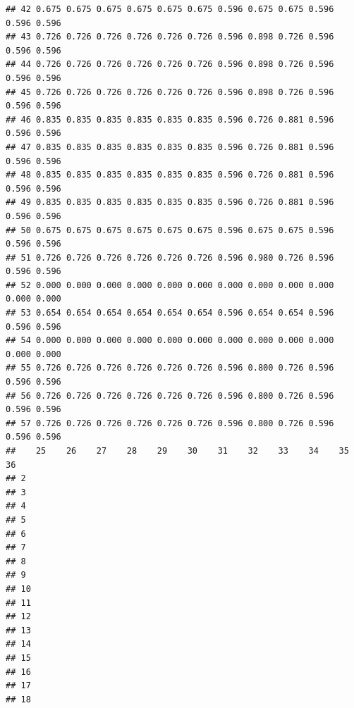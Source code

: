 \documentclass[
]{book}
\begin{document}
\begin{verbatim}
## 42 0.675 0.675 0.675 0.675 0.675 0.675 0.596 0.675 0.675 0.596 0.596 0.596
## 43 0.726 0.726 0.726 0.726 0.726 0.726 0.596 0.898 0.726 0.596 0.596 0.596
## 44 0.726 0.726 0.726 0.726 0.726 0.726 0.596 0.898 0.726 0.596 0.596 0.596
## 45 0.726 0.726 0.726 0.726 0.726 0.726 0.596 0.898 0.726 0.596 0.596 0.596
## 46 0.835 0.835 0.835 0.835 0.835 0.835 0.596 0.726 0.881 0.596 0.596 0.596
## 47 0.835 0.835 0.835 0.835 0.835 0.835 0.596 0.726 0.881 0.596 0.596 0.596
## 48 0.835 0.835 0.835 0.835 0.835 0.835 0.596 0.726 0.881 0.596 0.596 0.596
## 49 0.835 0.835 0.835 0.835 0.835 0.835 0.596 0.726 0.881 0.596 0.596 0.596
## 50 0.675 0.675 0.675 0.675 0.675 0.675 0.596 0.675 0.675 0.596 0.596 0.596
## 51 0.726 0.726 0.726 0.726 0.726 0.726 0.596 0.980 0.726 0.596 0.596 0.596
## 52 0.000 0.000 0.000 0.000 0.000 0.000 0.000 0.000 0.000 0.000 0.000 0.000
## 53 0.654 0.654 0.654 0.654 0.654 0.654 0.596 0.654 0.654 0.596 0.596 0.596
## 54 0.000 0.000 0.000 0.000 0.000 0.000 0.000 0.000 0.000 0.000 0.000 0.000
## 55 0.726 0.726 0.726 0.726 0.726 0.726 0.596 0.800 0.726 0.596 0.596 0.596
## 56 0.726 0.726 0.726 0.726 0.726 0.726 0.596 0.800 0.726 0.596 0.596 0.596
## 57 0.726 0.726 0.726 0.726 0.726 0.726 0.596 0.800 0.726 0.596 0.596 0.596
##    25    26    27    28    29    30    31    32    33    34    35    36   
## 2                                                                         
## 3                                                                         
## 4                                                                         
## 5                                                                         
## 6                                                                         
## 7                                                                         
## 8                                                                         
## 9                                                                         
## 10                                                                        
## 11                                                                        
## 12                                                                        
## 13                                                                        
## 14                                                                        
## 15                                                                        
## 16                                                                        
## 17                                                                        
## 18                                                                        

\end{verbatim}
\end{document}
